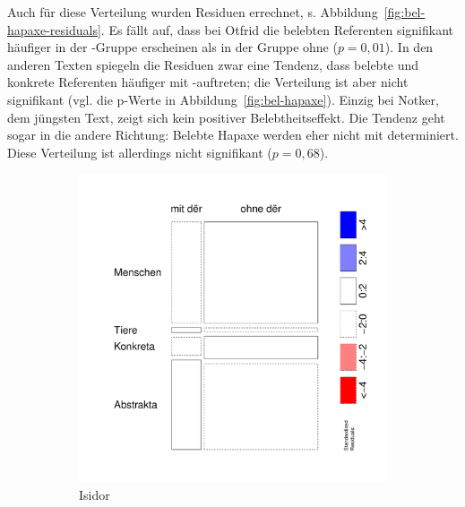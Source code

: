 Auch für diese Verteilung wurden Residuen errechnet, s. Abbildung~\ref{fig:bel-hapaxe-residuals}. Es fällt auf, dass bei Otfrid die belebten Referenten signifikant häufiger in der -Gruppe erscheinen als in der Gruppe ohne  ($p = 0,01$). In den anderen Texten spiegeln die Residuen zwar eine Tendenz, dass belebte und konkrete Referenten häufiger mit -auftreten; die Verteilung ist aber nicht signifikant (vgl. die p-Werte in Abbildung~\ref{fig:bel-hapaxe}). Einzig bei Notker, dem jüngsten Text, zeigt sich kein positiver Belebtheitseffekt. Die Tendenz geht sogar in die andere Richtung: Belebte Hapaxe werden eher nicht mit  determiniert. Diese Verteilung ist allerdings nicht signifikant ($p = 0,68$).  

\begin{figure}
\begin{subfigure}[b]{.5\linewidth}
  \includegraphics[height=.25\textheight]{generated/images/residuals-bel-I}
\caption {Isidor}
\end{subfigure}%
\begin{subfigure}[b]{.5\linewidth}

\end{subfigure}
\end{figure}
